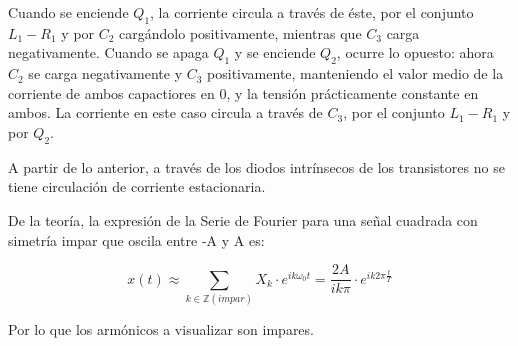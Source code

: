 \documentclass[e4_tp3_main.tex]{subfiles}
\begin{document}
Cuando se enciende $Q_1$, la corriente circula a través de éste, por el conjunto $L_1 - R_1$ y por $C_2$ cargándolo positivamente, mientras que $C_3$ carga negativamente. Cuando se apaga $Q_1$ y se enciende $Q_2$, ocurre lo opuesto: ahora $C_2$ se carga negativamente y $C_3$ positivamente, manteniendo el valor medio de la corriente de ambos capactiores en 0, y la tensión prácticamente constante en ambos. La corriente en este caso circula a través de $C_3$, por el conjunto $L_1 - R_1$ y por $Q_2$.\par
A partir de lo anterior, a través de los diodos intrínsecos de los transistores no se tiene circulación de corriente estacionaria.

De la teoría, la expresión de la Serie de Fourier para una señal cuadrada con simetría impar que oscila entre -A y A es:

\[
x(t) \approx \sum_{k \in \mathbb Z (impar)}^{}X_k \cdot e^{ik\omega_0 t} = \frac{2A}{ik\pi} \cdot e^{ik2\pi \frac{t}{T}} 
\]

Por lo que los armónicos a visualizar son impares.

\end{document}

